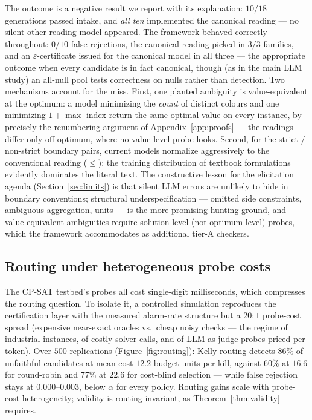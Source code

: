 \documentclass[pdflatex,sn-mathphys-num]{sn-jnl}
\theoremstyle{thmstyleone}
\theoremstyle{thmstyletwo}
\begin{document}
The outcome is a negative result we report with its explanation:
$10/18$ generations passed intake, and \emph{all ten} implemented the
canonical reading --- no silent other-reading model appeared.
The framework behaved correctly throughout: $0/10$ false rejections,
the canonical reading picked in $3/3$ families, and an
$\varepsilon$-certificate issued for the canonical model in all three
--- the appropriate outcome when every candidate is in fact
canonical, though (as in the main LLM study) an all-null pool tests
correctness on nulls rather than detection. Two mechanisms
account for the miss. First, one planted ambiguity is
value-equivalent at the optimum: a model minimizing the \emph{count}
of distinct colours and one minimizing $1 + \max$ index return the
same optimal value on every instance, by precisely the renumbering
argument of Appendix~\ref{app:proofs} --- the readings differ only
off-optimum, where no value-level probe looks. Second, for the strict
/ non-strict boundary pairs, current models normalize aggressively to
the conventional reading ($\le$): the training distribution of
textbook formulations evidently dominates the literal text. The
constructive lesson for the elicitation agenda
(Section~\ref{sec:limits}) is that silent LLM errors are unlikely to
hide in boundary conventions; structural underspecification ---
omitted side constraints, ambiguous aggregation, units --- is the
more promising hunting ground, and value-equivalent ambiguities
require solution-level (not optimum-level) probes, which the
framework accommodates as additional tier-A checkers.

\subsection{Routing under heterogeneous probe costs}
\label{sec:heterogeneity}

The CP-SAT testbed's probes all cost single-digit milliseconds, which
compresses the routing question. To isolate it, a controlled
simulation reproduces the certification layer with the measured
alarm-rate structure but a $20{:}1$ probe-cost spread (expensive
near-exact oracles vs.\ cheap noisy checks --- the regime of
industrial instances, of costly solver calls, and of LLM-as-judge
probes priced per token). Over $500$ replications
(Figure~\ref{fig:routing}): Kelly routing detects $86\%$ of
unfaithful candidates at mean cost $12.2$ budget units per kill,
against $60\%$ at $16.6$ for round-robin and $77\%$ at $22.6$ for
cost-blind selection --- while false rejection stays at
$0.000$--$0.003$, below $\alpha$ for every policy. Routing gains
scale with probe-cost heterogeneity; validity is routing-invariant,
as Theorem~\ref{thm:validity} requires.
\end{document}
